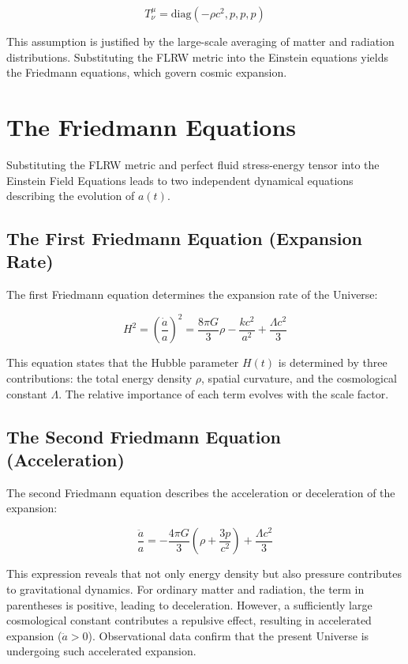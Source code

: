\documentclass[12pt, a4paper]{article}
\begin{document}
\begin{equation}
T^{\mu}_{\nu} = \text{diag}(-\rho c^2, p, p, p)
\end{equation}

This assumption is justified by the large-scale averaging of matter and radiation distributions. Substituting the FLRW metric into the Einstein equations yields the Friedmann equations, which govern cosmic expansion.

\section{The Friedmann Equations}

Substituting the FLRW metric and perfect fluid stress-energy tensor into the Einstein Field Equations leads to two independent dynamical equations describing the evolution of $a(t)$.

\subsection{The First Friedmann Equation (Expansion Rate)}

The first Friedmann equation determines the expansion rate of the Universe:

\begin{equation}
H^2 = \left( \frac{\dot{a}}{a} \right)^2 = \frac{8\pi G}{3} \rho - \frac{kc^2}{a^2} + \frac{\Lambda c^2}{3}
\end{equation}

This equation states that the Hubble parameter $H(t)$ is determined by three contributions: the total energy density $\rho$, spatial curvature, and the cosmological constant $\Lambda$. The relative importance of each term evolves with the scale factor.

\subsection{The Second Friedmann Equation (Acceleration)}

The second Friedmann equation describes the acceleration or deceleration of the expansion:

\begin{equation}
\frac{\ddot{a}}{a} = -\frac{4\pi G}{3} \left( \rho + \frac{3p}{c^2} \right) + \frac{\Lambda c^2}{3}
\end{equation}

This expression reveals that not only energy density but also pressure contributes to gravitational dynamics. For ordinary matter and radiation, the term in parentheses is positive, leading to deceleration. However, a sufficiently large cosmological constant contributes a repulsive effect, resulting in accelerated expansion ($\ddot{a} > 0$). Observational data confirm that the present Universe is undergoing such accelerated expansion.
\end{document}
